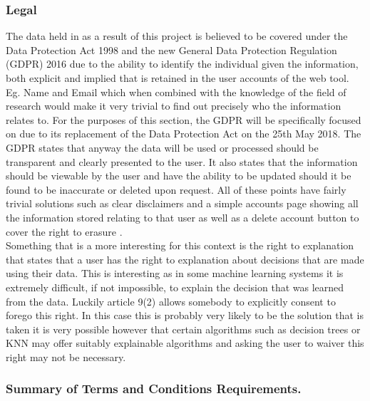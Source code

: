 \documentclass{ecmm427_assignment}
\begin{document}
\subsubsection{Legal}

\quad The data held in as a result of this project is believed to be covered
under the Data Protection Act 1998 and the new General Data Protection
Regulation (GDPR) 2016 due to the ability to identify the individual
given the information, both explicit and implied that is retained in
the user accounts of the web tool. Eg. Name and Email which when combined
with the knowledge of the field of research would make it very trivial
to find out precisely who the information relates to. For the purposes
of this section, the GDPR will be specifically focused on due to its
replacement of the Data Protection Act on the 25th May 2018. The GDPR
states that anyway the data will be used or processed should be
transparent and clearly presented to the user. It also states that
the information should be viewable by the user and have the ability
to be updated should it be found to be inaccurate or deleted upon
request. All of these points have fairly trivial solutions such as
clear disclaimers and a simple accounts page showing all the information
stored relating to that user as well as a delete account button to
cover the right to erasure \cite{eu:gdpr}. \\

\quad Something that is a more interesting for this context is the right
to explanation that states that a user has the right to explanation
about decisions that are made using their data. This is interesting
as in some machine learning systems it is extremely difficult, if
not impossible, to explain the decision that was learned from the
data. Luckily article 9(2) allows somebody to explicitly consent
to forego this right. In this case this is probably very likely to
be the solution that is taken it is very possible however that certain
algorithms such as decision trees or KNN may offer suitably explainable
algorithms and asking the user to waiver this right may not be necessary. 

\subsubsection{Summary of Terms and Conditions Requirements.}
\end{document}
